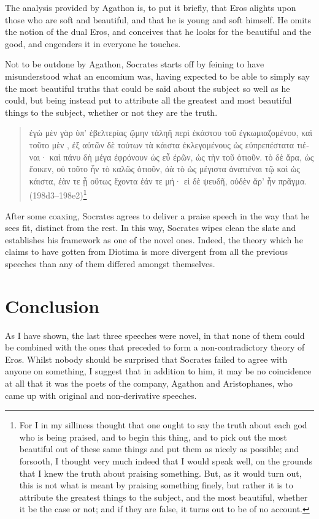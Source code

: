 The analysis provided by Agathon is, to put it briefly, that Eros
alights upon those who are soft and beautiful, and that he is young and
soft himself. He omits the notion of the dual Eros, and conceives that
he looks for the beautiful and the good, and engenders it in everyone he
touches.

Not to be outdone by Agathon, Socrates starts off by feining to have
misunderstood what an encomium was, having expected to be able to simply
say the most beautiful truths that could be said about the subject so
well as he could, but being instead put to attribute all the greatest
and most beautiful things to the subject, whether or not they are the
truth.

\begin{quote}
\textgreek{ἐγὼ μὲν γὰρ ὑπ' ἐβελτερίας ᾤμην  τἀληῆ
 περὶ ἑκάστου τοῦ ἐγκωμιαζομένου, καὶ τοῦτο μὲν
, ἐξ αὐτῶν δὲ τούτων τὰ κάιστα ἐκλεγομένους ὡς
εὐπρεπέστατα τιέναι· καὶ πάνυ δὴ μέγα ἐφρόνουν ὡς εὖ ἐρῶν, ὡς
 τὴν  τοῦ  ὁτιοῦν. τὸ
δὲ ἄρα, ὡς ἔοικεν, οὐ τοῦτο ἦν τὸ καλῶς  ὁτιοῦν,
ἀὰ τὸ ὡς μέγιστα ἀνατιέναι τῷ  καὶ ὡς
κάιστα, ἐὰν τε ᾖ οὕτως ἔχοντα ἐάν τε μή· εἰ δὲ ψευδῆ, οὐδὲν
ἄρ' ἦν πρᾶγμα.} (198d3--198e2)\footnote{For I in my silliness thought
that one ought to say the truth about each god who is being praised,
and to begin this thing, and to pick out the most beautiful out of
these same things and put them as nicely as possible; and forsooth, I
thought very much indeed that I would speak well, on the grounds that
I knew the truth about praising something. But, as it would turn out,
this is not what is meant by praising something finely, but rather it
is to attribute the greatest things to the subject, and the most
beautiful, whether it be the case or not; and if they are false, it
turns out to be of no account.}
\end{quote}

After some coaxing, Socrates agrees to deliver a praise speech in the
way that he sees fit, distinct from the rest. In this way, Socrates
wipes clean the slate and establishes his framework as one of the novel
ones. Indeed, the theory which he claims to have gotten from Diotima is
more divergent from all the previous speeches than any of them differed
amongst themselves.

\section{Conclusion}

As I have shown, the last three speeches were novel, in that none of
them could be combined with the ones that preceded to form a
non-contradictory theory of Eros. Whilst nobody should be surprised that
Socrates failed to agree with anyone on something, I suggest that in
addition to him, it may be no coincidence at all that it was the poets
of the company, Agathon and Aristophanes, who came up with original and
non-derivative speeches.
